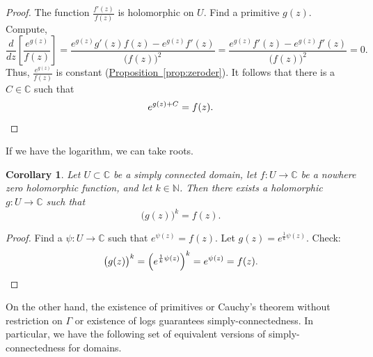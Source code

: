 \documentclass[12pt,openany]{book}
\newcommand{\C}{{\mathbb{C}}}
\newcommand{\N}{{\mathbb{N}}}
\theoremstyle{plain}
\newtheorem{cor}[thm]{Corollary}
\theoremstyle{remark}
\theoremstyle{definition}
\theoremstyle{exercise}
\theoremstyle{example}
\newcommand{\propref}[1]{\hyperref[#1]{Proposition~\ref*{#1}}}
\begin{document}
\begin{proof}
The function $\frac{f'(z)}{f(z)}$ is holomorphic on $U$.
Find a primitive $g(z)$.  Compute,
\begin{equation*}
\frac{d}{dz} \left[ \frac{e^{g(z)}}{f(z)} \right] =
\frac{ e^{g(z)} g'(z) f(z) - e^{g(z)} f'(z) }{{\bigl(f(z)\bigr)}^2}
=
\frac{ e^{g(z)} f'(z) - e^{g(z)} f'(z) }{{\bigl(f(z)\bigr)}^2}
=
0 .
\end{equation*}
Thus, $\frac{e^{g(z)}}{f(z)}$ is constant
(\propref{prop:zeroder}).  It follows that
there is a $C \in \C$ such that
\begin{equation*}
e^{g(z) + C} = f(z) .
\qedhere
\end{equation*}
\end{proof}

If we have the logarithm, we can take roots.

\begin{cor}
Let $U \subset \C$ be a simply connected domain,
let $f \colon U \to \C$ be a nowhere zero holomorphic
function, and let $k \in \N$.
Then there exists a holomorphic $g \colon U \to \C$
such that
\begin{equation*}
{\bigl(g(z)\bigr)}^k = f(z) .
\end{equation*}
\end{cor}

\begin{proof}
Find a $\psi \colon U \to \C$ such that $e^{\psi(z)} = f(z)$.  Let
$g(z) = e^{\frac{1}{k} \psi(z)}$.  Check:
\begin{equation*}
{\bigl(g(z)\bigr)}^k
=
{\left( e^{\frac{1}{k} \psi(z)} \right)}^k
=
e^{\psi(z)} = f(z) . \qedhere
\end{equation*}
\end{proof}

On the other hand, the existence of primitives or
Cauchy's theorem without restriction on $\Gamma$ or existence of logs guarantees
simply-connectedness.  In particular, we have the following set of equivalent
versions of simply-connectedness for domains.
\end{document}
